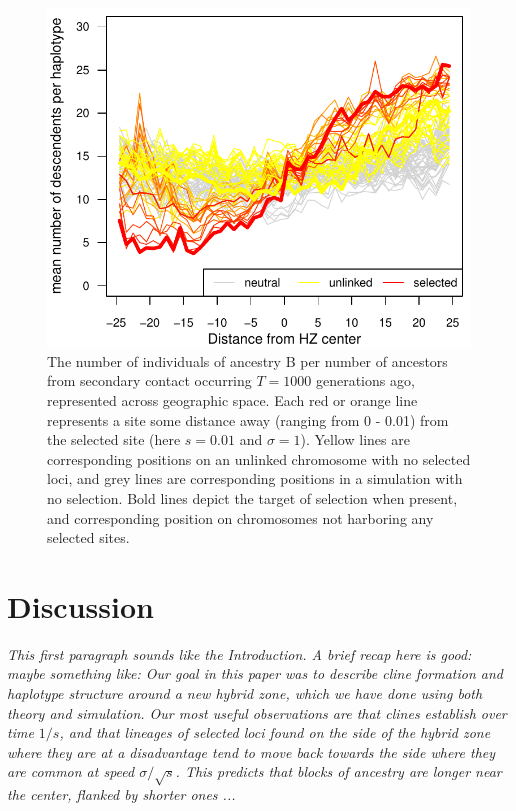 \documentclass[11pt,letterpaper]{article}
\newcommand{\plr}[1]{{\em \color{blue} #1}}
\begin{document}
\begin{figure}
\includegraphics{figs/number_of_ancestors_tau1000}
\caption{The number of individuals of ancestry B per number of ancestors from secondary contact occurring $T=1000$ generations ago, represented across geographic space. Each red or orange line represents a site some distance away (ranging from 0 - 0.01) from the selected site (here $s=0.01$ and $\sigma=1$). Yellow lines are corresponding positions on an unlinked chromosome with no selected loci, and grey lines are corresponding positions in a simulation with no selection.  Bold lines depict the target of selection when present, and corresponding position on chromosomes not harboring any selected sites.}\label{Fig:family_size}
\end{figure}


\section*{Discussion}

\plr{This first paragraph sounds like the Introduction.  A brief recap here is good: maybe something like:
    Our goal in this paper was to describe cline formation and haplotype structure around a new hybrid zone,
    which we have done using both theory and simulation.
    Our most useful observations are that clines establish over time $1/s$,
    and that lineages of selected loci found on the side of the hybrid zone where they are at a disadvantage
    tend to move back towards the side where they are common
    at speed $\sigma/\sqrt{s}$.
    This predicts that blocks of ancestry are longer near the center, flanked by shorter ones ...
}
\end{document}
